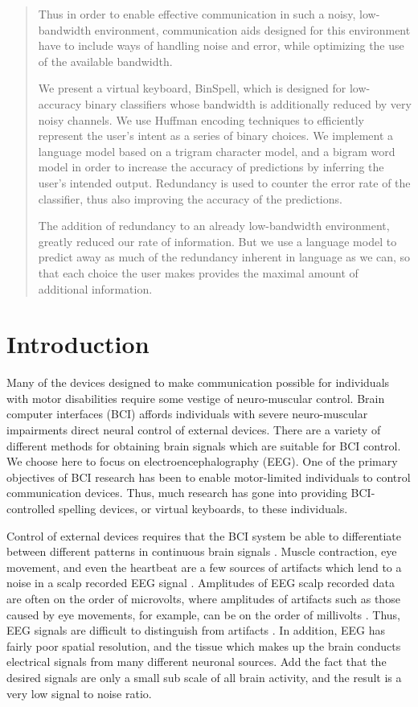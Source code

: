\documentclass[12pt,titlepage]{article}
\begin{document}
\begin{abstract}
Thus in order to enable effective communication in such a noisy, low-bandwidth environment, 
communication aids designed for this environment have to include ways of handling noise and 
error, while optimizing the use of the available bandwidth.

We present a virtual keyboard, BinSpell, which is designed for low-accuracy binary classifiers 
whose bandwidth is additionally reduced by very noisy channels.  We use Huffman encoding 
techniques to efficiently represent the user's intent as a series of binary choices.  We implement 
a language model based on a trigram character model, and a bigram word model in order to 
increase the accuracy of predictions by inferring the user's intended output. Redundancy is used 
to counter the error rate of the classifier, thus also improving the accuracy of the predictions.

The addition of redundancy to an already low-bandwidth environment, greatly reduced our rate 
of information. But we use a language model to predict away as much of the redundancy 
inherent in language as we can, so that each choice the user makes provides the maximal 
amount of additional information.
\end{abstract}


\section{Introduction}

Many of the devices designed to make communication possible for individuals with motor 
disabilities require some vestige of neuro-muscular control.  Brain computer interfaces (BCI) 
affords individuals with severe neuro-muscular impairments direct neural control of external 
devices.  There are a variety of different methods for obtaining brain signals which are suitable 
for BCI control.  We choose here to focus on electroencephalography (EEG).  One of the 
primary objectives of BCI research has been to enable motor-limited individuals to control 
communication devices.  Thus, much research has gone into providing BCI-controlled spelling 
devices, or virtual keyboards, to these individuals.

Control of external devices requires that the BCI system be able to differentiate between 
different patterns in continuous brain signals \cite{lotte_review_2007}.  Muscle contraction, eye movement, and even the heartbeat are a few sources of artifacts which lend to a noise in a scalp recorded EEG signal \cite{nunez_electric_2005}.  Amplitudes of EEG scalp recorded data are often on the order of microvolts, where amplitudes of artifacts such as those caused by eye movements, for example, can be on the order of millivolts \cite{tatum2007handbook}.  Thus, EEG signals are difficult to distinguish from artifacts \cite{nunez_electric_2005}.  In addition, EEG has fairly poor spatial resolution, and the tissue which makes up the brain conducts electrical signals from many different neuronal sources.  Add the fact that the desired signals are only a small sub scale of all brain activity, and the result is a very low signal to noise ratio.
\end{document}

